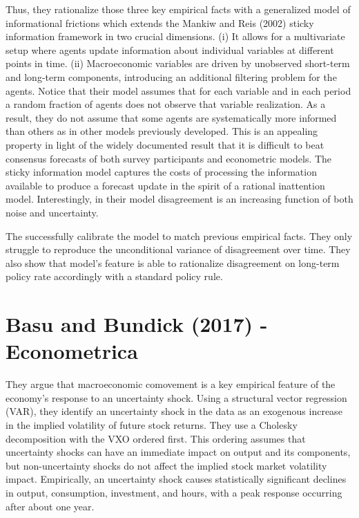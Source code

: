 \documentclass{article}
\begin{document}
{Thus, they rationalize those three key empirical facts with a generalized model of informational frictions which extends the Mankiw and Reis (2002) sticky information framework in two crucial dimensions. (i) It allows for a multivariate setup where agents update information about individual variables at different points in time. (ii) Macroeconomic variables are driven by unobserved short-term and long-term components, introducing an additional filtering problem for the agents. Notice that their model assumes that for each variable and in each period a random fraction of agents does not observe that variable realization. As a result, they do not assume that some agents are systematically more informed than others as in other models previously developed. This is an appealing property in light of the widely documented result that it is difficult to beat consensus forecasts of both survey participants and econometric models. The sticky information model captures the costs of processing the information available to produce a forecast update in the spirit of a rational inattention model. Interestingly, in their model disagreement is an increasing function of both noise and uncertainty. 

The successfully calibrate the model to match previous empirical facts. They only struggle to reproduce the unconditional variance of disagreement over time. They also show that model's feature is able to rationalize disagreement on long-term policy rate accordingly with a standard policy rule.

\section{Basu and Bundick (2017) - Econometrica}

They argue that macroeconomic comovement is a key empirical feature of the economy's response to an uncertainty shock. Using a structural vector regression (VAR), they identify an uncertainty shock in the data as an exogenous increase in the implied volatility of future stock returns. They use a Cholesky decomposition with the VXO ordered first. This ordering assumes that uncertainty shocks can have an immediate impact on output and its components, but non-uncertainty shocks do not affect the implied stock market volatility impact. Empirically, an uncertainty shock causes statistically significant declines in output, consumption, investment, and hours, with a peak response occurring after about one year. 

}
\end{document}
